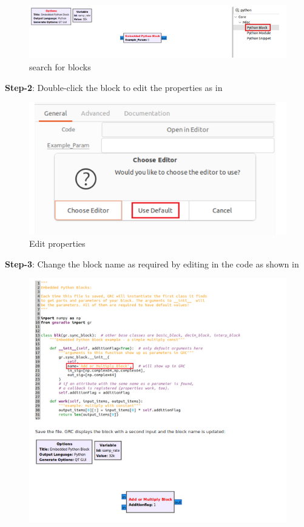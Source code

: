 \begin{enumerate}[label=\arabic*.,ref=\thesection.\theenumi]
\begin{figure}[H]
\centering
\includegraphics[width=\columnwidth]{fm/rx/figs/step_1.png}
\caption{search for blocks}
\label{fig:search for blocks}
\end{figure}
\textbf{Step-2}:
Double-click the block to edit the properties as in 
\begin{figure}[H]
\centering
\includegraphics[width=0.7\columnwidth]{fm/rx/figs/step_2.png}
\caption{Edit properties}
\label{fig:Edit properties}
\end{figure}
\textbf{Step-3}:
Change the block name as required by editing in the code as shown in                                                
\begin{figure}[H]
\centering
\includegraphics[width=\columnwidth]{fm/rx/figs/step_3.png}

\end{figure}
\end{enumerate}

